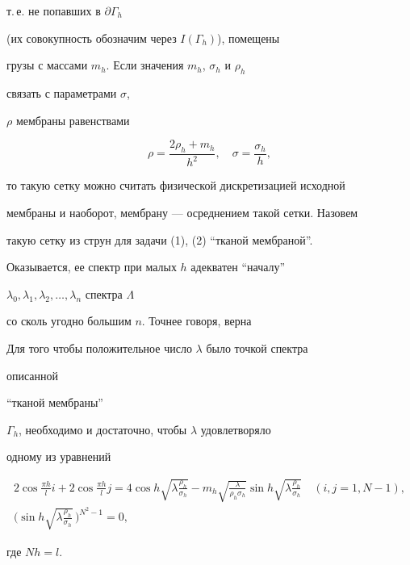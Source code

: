 т.\,е. не попавших в $\partial\Gamma_h$ 


(их совокупность обозначим через $I(\Gamma_h)$), помещены 


грузы с массами $m_h$. Если значения $m_h$, $\sigma_h$ и $\rho_h$ 


связать с параметрами $\sigma$, 


$\rho$ мембраны равенствами 


\begin{equation} 


\rho=\frac{2\rho_h+m_h}{h^2},\quad 


\sigma=\frac{\sigma_h}{h}, 


\end{equation} 


то такую сетку можно считать физической дискретизацией исходной 


мембраны и наоборот, мембрану --- осреднением такой сетки. Назовем 


такую сетку из струн для задачи (1), (2) ``тканой мембраной''. 


Оказывается, ее спектр при малых $h$ адекватен ``началу'' 


$\lambda_0,\lambda_1,\lambda_2,\dotsc,\lambda_n$ спектра $\Lambda$ 


со сколь угодно большим $n$. Точнее говоря, верна 


 


\begin{thm} 


Для того чтобы положительное число $\lambda$ было точкой спектра 


описанной 


``тканой мембраны'' 


$\Gamma_h$, необходимо и достаточно, чтобы $\lambda$ удовлетворяло 


одному из уравнений 


\begin{gather} 


2\cos\frac{\pi h}{l}i+2\cos\frac{\pi h}{l}j= 


4\cos h\sqrt{\lambda\frac{\rho_h}{\sigma_h}}- 


m_h\sqrt{\frac{\lambda}{\rho_h\sigma_h}} 


\sin h\sqrt{\lambda\frac{\rho_h}{\sigma_h}}\quad 


(i,j=1,N-1),\\ 


% 


\bigg(\sin h\sqrt{\lambda\frac{\rho_h}{\sigma_h}} 


\,\bigg)^{N^2-1}=0, 


\end{gather} 


где $Nh=l$. 


\end{thm} 


